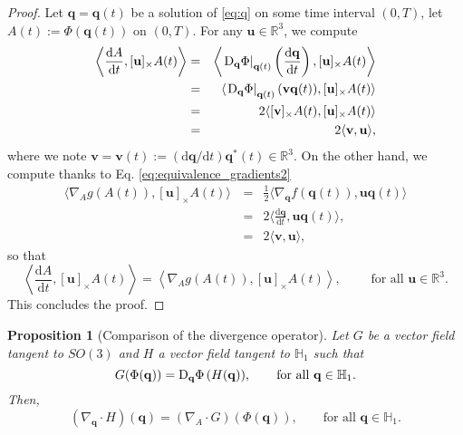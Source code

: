 \documentclass[12pt]{article}
\def\R{\mathbb{R}}
\def\la{\langle}
\def\ra{\rangle}
\newtheorem{proposition}[theorem]{Proposition}
\newcommand{\beqar}{\begin{eqnarray*}}
\newcommand{\eeqar}{\end{eqnarray*}}
\newcommand{\lp}{\left(}
\newcommand{\rp}{\right)}
\newcommand{\be}{\begin{equation}}
\newcommand{\ee}{\end{equation}}
\newcommand{\uu}{\mathbf{u}}
\newcommand{\vv}{\mathbf{v}}
\newcommand{\ud}{\mathrm{d}}
\newcommand{\unitq}{{\mathbb{H}_1}}
\newcommand{\q}{\mathbf{q}}
\begin{document}
\begin{proof}
\bigskip

Let $\q=\q(t)$ be a solution of \eqref{eq:q} on some time interval $(0,T)$, let $ A(t) := \Phi(\q(t))$ on $(0,T)$. For any $\uu\in\R^3$, we compute
\beqar
\left\la \frac{\ud A}{\ud t}, [\uu]_\times A(t) \right\ra &=& \left\la \left.\textnormal{D}_\q\Phi\right|_{\q(t)}\lp \frac{\ud\q}{\ud t}\rp, [\uu]_\times A(t) \right\ra\\
&=& \la \left.\textnormal{D}_\q\Phi\right|_{\q(t)} (\vv\q(t)), [\uu]_\times A(t) \ra \\
&=& 2\la [\vv]_\times A(t), [\uu]_\times A(t)\ra \\
&=& 2\la \vv, \uu\ra,
\eeqar
where we note $\vv=\vv(t):=(\ud \q /\ud t)\q^\ast(t) \in \R^3$. On the other hand, we compute thanks to Eq. \eqref{eq:equivalence_gradients2}
\beqar
\la \nabla_A g(A(t)), [\uu]_\times A(t)\ra \, &=& \frac{1}{2}\langle\nabla_\q f(\q(t)), \uu\q(t) \rangle\\
&=&2\langle \frac{\ud\q}{\ud t}, \uu\q(t) \rangle,\\
&=& 2\la \vv, \uu\rangle,
\eeqar
so that
\be \label{eq:definition_gradient}
 \left\la \frac{\ud A}{\ud t}, [\uu]_\times A(t) \right\rangle = \left\langle \nabla_A g(A(t)), [\uu]_\times A(t) \right\rangle, \qquad \mbox{ for all } \uu\in \mathbb{R}^3.
\ee
This concludes the proof.
\end{proof}



\begin{proposition}[Comparison of the divergence operator]
\label{lem:equivalence_divergence}
Let $G$ be a vector field tangent to $SO(3)$ and $H$ a vector field tangent to $\unitq $ such that
\be \label{eq:PTA_PTq}
 G (\Phi(\q)) = \textnormal{D}_\q \Phi \, (H(\q)), \qquad\mbox{for all } \q\in \unitq.
\ee
Then,
\be \label{eq:equivalence_divergence}
(\nabla_\q \cdot H)(\q)= (\nabla_A\cdot G)(\Phi(\q)), \qquad\mbox{for all } \q\in \unitq.
\ee
\end{proposition}
\end{document}
